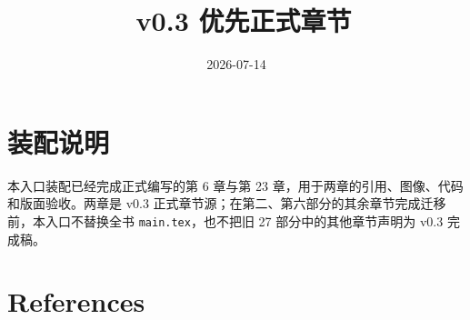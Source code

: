 \documentclass[UTF8,a4paper,12pt,openany]{ctexbook}
\title{\ReportTitle\ v0.3 优先正式章节}
\author{\ReportAuthor}
\date{2026-07-14}
\begin{document}
\frontmatter
\maketitle
\chapter*{装配说明}
本入口装配已经完成正式编写的第 6 章与第 23 章，用于两章的引用、图像、代码和版面验收。两章是 v0.3 正式章节源；在第二、第六部分的其余章节完成迁移前，本入口不替换全书 \texttt{main.tex}，也不把旧 27 部分中的其他章节声明为 v0.3 完成稿。
\tableofcontents

\mainmatter
\setcounter{chapter}{5}

\setcounter{chapter}{22}


\backmatter
\chapter{References}
\printbibliography[heading=none]
\end{document}
